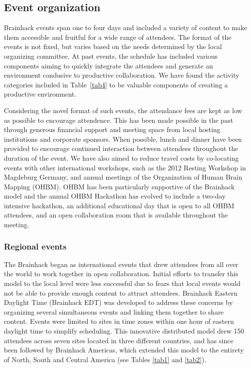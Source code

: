 \documentclass[11pt]{bmc_article_s50}
\begin{document}
\subsection{Event organization}

Brainhack events span one to four days and included a variety of content to make them accessible and fruitful for a wide range of attendees. The format of the events is not fixed, but varies based on the needs determined by the local organizing committee. At past events, the schedule has included various components aiming to quickly integrate the attendees and generate an environment condusive to productive collaboration. We have found the activity categories included in Table~\ref{tab4} to be valuable components of creating a productive environment. 

Considering the novel format of such events, the attendance fees are kept as low as possible to encourage attendence. This has been made possible in the past through generous financial support and meeting space from local hosting institutions and corporate sponsors. When possible, lunch and dinner have been provided to encourage continued interaction between attendees throughout the duration of the event. We have also aimed to reduce travel costs by co-locating events with other international workshops, such as the 2012 Resting Workshop in Magdeburg Germany, and annual meetings of the Organization of Human Brain Mapping (OHBM). OHBM has been particularly supportive of the Brainhack model and the annual OHBM Hackathon has evolved to include a two-day intensive hackathon, an additional educational day that is open to all OHBM attendees, and an open collaboration room that is available throughout the meeting.

\subsubsection{Regional events}

The Brainhack began as international events that drew attendees from all over the world to work together in open collaboration. Initial efforts to transfer this model to the local level were less successful due to fears that local events would not be able to provide enough content to attract attendees. Brainhack Eastern Daylight Time (Brainhack EDT) was developed to address these concerns by organizing several simultaneous events and linking them together to share content. Events were limited to sites in time zones within one hour of eastern daylight time to simplify scheduling. This innovative distributed model drew 150 attendees across seven sites located in three different countries, and has since been followed by Brainhack Americas, which extended this model to the entirety of North, South and Central America (see Tables \ref{tab1} and \ref{tab2}).
\end{document}
